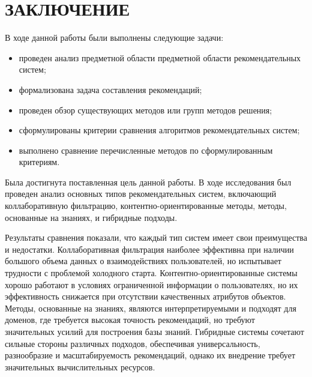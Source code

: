 \chapter*{ЗАКЛЮЧЕНИЕ}

В ходе данной работы были выполнены следующие задачи:
\begin{itemize}
    \item проведен анализ предметной области предметной области рекомендательных систем;
    \item формализована задача составления рекомендаций;
    \item проведен обзор существующих методов или групп методов решения;
    \item сформулированы критерии сравнения алгоритмов рекомендательных систем;
    \item выполнено сравнение перечисленные методов по сформулированным критериям.
\end{itemize}

Была достигнута поставленная цель данной работы.
В ходе исследования был проведен анализ основных типов рекомендательных систем,
включающий коллаборативную фильтрацию, контентно-ориентированные методы, методы,
основанные на знаниях, и гибридные подходы.

Результаты сравнения показали, что каждый тип систем имеет свои преимущества и недостатки.
Коллаборативная фильтрация наиболее эффективна при наличии большого объема данных о
взаимодействиях пользователей, но испытывает трудности с проблемой холодного старта.
Контентно-ориентированные системы хорошо работают в условиях ограниченной информации о
пользователях, но их эффективность снижается при отсутствии качественных атрибутов объектов.
Методы, основанные на знаниях, являются интерпретируемыми и подходят для доменов,
где требуется высокая точность рекомендаций, но требуют значительных усилий для построения базы
знаний. Гибридные системы сочетают сильные стороны различных подходов, обеспечивая универсальность,
разнообразие и масштабируемость рекомендаций, однако их внедрение требует значительных вычислительных ресурсов.
